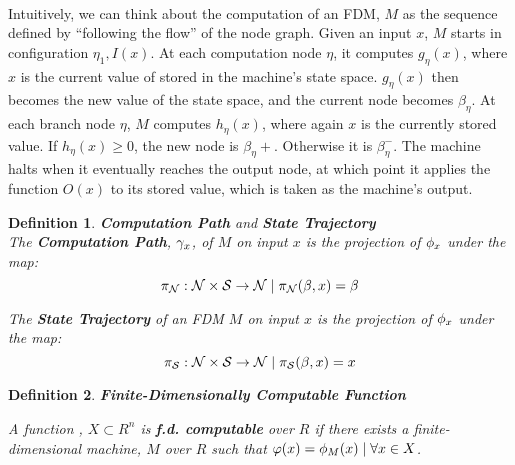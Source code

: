 \documentclass[twoside]{article}
\newtheorem{definition}{Definition}[section]
\begin{document}
\\

Intuitively, we can think about the computation of an FDM, $M$ as the
sequence defined by ``following the flow'' of the node graph.  Given
an input $x$, $M$ starts in configuration $\eta_1, I(x)$. At each
computation node $\eta$, it computes $g_\eta(x)$, where $x$ is the
current value of stored in the machine's state space.  $g_\eta(x)$
then becomes the new value of the state space, and the current node
becomes $\beta_{\eta}$.  At each branch node $\eta$, $M$ computes
$h_\eta(x)$, where again $x$ is the currently stored value.  If
$h_\eta(x) \geq 0$, the new node is $\beta_\eta+$.  Otherwise it is
$\beta_\eta^-$.  The machine halts when it eventually reaches the
output node, at which point it applies the function $O(x)$ to
its stored value, which is taken as the machine's output.

\begin{definition}{\textbf{Computation Path} and \textbf{State Trajectory}}\\
  
  The \textbf{Computation Path}, $\gamma_x$, of $M$ on
  input $x$ is the projection of $\phi_x$ under the map:
  $$\pi_{\mathcal{N}}:\mathcal{N} \times \mathcal{S} \rightarrow \mathcal{N} \mid \pi_{\mathcal{N}}(\beta, x) = \beta$$
  
  The \textbf{State Trajectory} of an FDM $M$ on input $x$ is the
  projection of $\phi_x$ under the map:
  $$\pi_{\mathcal{S}}:\mathcal{N} \times \mathcal{S} \rightarrow \mathcal{N} \mid \pi_{\mathcal{S}}(\beta, x) = x$$
\end{definition}


\begin{definition}{\textbf{Finite-Dimensionally Computable Function}}
  
  A function , $X \subset R^n$ is
  \textbf{f.d. computable} over $R$ if there exists a
  finite-dimensional machine, $M$ over $R$ such that $\varphi(x) =
  \phi_M(x) \mid \forall x \in X$.
  
\end{definition}
\end{document}
